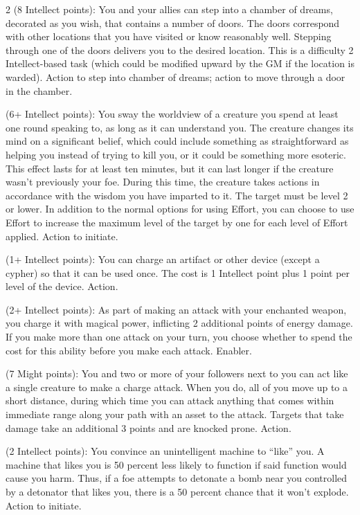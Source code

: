 \begin{multicols}{2}
 (8 Intellect points): You and your allies can step into a chamber of dreams, decorated as you wish, that contains a number of doors. The doors correspond with other locations that you have visited or know reasonably well. Stepping through one of the doors delivers you to the desired location. This is a difficulty 2 Intellect-based task (which could be modified upward by the GM if the location is warded). Action to step into chamber of dreams; action to move through a door in the chamber. 

 (6+ Intellect points): You sway the worldview of a creature you spend at least one round speaking to, as long as it can understand you. The creature changes its mind on a significant belief, which could include something as straightforward as helping you instead of trying to kill you, or it could be something more esoteric. This effect lasts for at least ten minutes, but it can last longer if the creature wasn’t previously your foe. During this time, the creature takes actions in accordance with the wisdom you have imparted to it. The target must be level 2 or lower. In addition to the normal options for using Effort, you can choose to use Effort to increase the maximum level of the target by one for each level of Effort applied. Action to initiate. 

 (1+ Intellect points): You can charge an artifact or other device (except a cypher) so that it can be used once. The cost is 1 Intellect point plus 1 point per level of the device. Action. 

 (2+ Intellect points): As part of making an attack with your enchanted weapon, you charge it with magical power, inflicting 2 additional points of energy damage. If you make more than one attack on your turn, you choose whether to spend the cost for this ability before you make each attack. Enabler. 

 (7 Might points): You and two or more of your followers next to you can act like a single creature to make a charge attack. When you do, all of you move up to a short distance, during which time you can attack anything that comes within immediate range along your path with an asset to the attack. Targets that take damage take an additional 3 points and are knocked prone. Action. 

 (2 Intellect points): You convince an unintelligent machine to “like” you. A machine that likes you is 50 percent less likely to function if said function would cause you harm. Thus, if a foe attempts to detonate a bomb near you controlled by a detonator that likes you, there is a 50 percent chance that it won’t explode. Action to initiate. 


\end{multicols}
